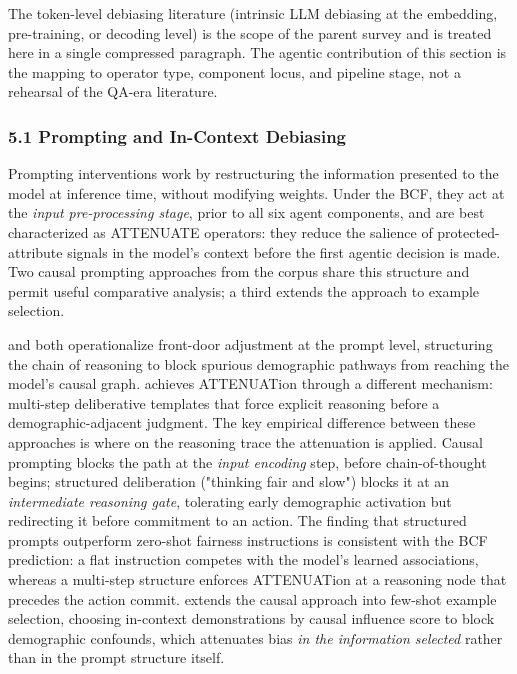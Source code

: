 \documentclass[10pt]{article}
\begin{document}
The token-level debiasing literature (intrinsic LLM debiasing at the embedding, pre-training, or decoding level) is the scope of the parent survey \cite{chu2024fairness} and is treated here in a single compressed paragraph. The agentic contribution of this section is the mapping to operator type, component locus, and pipeline stage, not a rehearsal of the QA-era literature.

\subsubsection*{5.1 Prompting and In-Context Debiasing}

Prompting interventions work by restructuring the information presented to the model at inference time, without modifying weights. Under the BCF, they act at the \emph{input pre-processing stage}, prior to all six agent components, and are best characterized as ATTENUATE operators: they reduce the salience of protected-attribute signals in the model's context before the first agentic decision is made. Two causal prompting approaches from the corpus share this structure and permit useful comparative analysis; a third extends the approach to example selection.

\cite{li2024prompting} and \cite{zhang2024causal} both operationalize front-door adjustment at the prompt level, structuring the chain of reasoning to block spurious demographic pathways from reaching the model's causal graph. \cite{furniturewala2024thinking} achieves ATTENUATion through a different mechanism: multi-step deliberative templates that force explicit reasoning before a demographic-adjacent judgment. The key empirical difference between these approaches is where on the reasoning trace the attenuation is applied. Causal prompting blocks the path at the \emph{input encoding} step, before chain-of-thought begins; structured deliberation ("thinking fair and slow") blocks it at an \emph{intermediate reasoning gate}, tolerating early demographic activation but redirecting it before commitment to an action. The \cite{furniturewala2024thinking} finding that structured prompts outperform zero-shot fairness instructions is consistent with the BCF prediction: a flat instruction competes with the model's learned associations, whereas a multi-step structure enforces ATTENUATion at a reasoning node that precedes the action commit. \cite{du2024causal} extends the causal approach into few-shot example selection, choosing in-context demonstrations by causal influence score to block demographic confounds, which attenuates bias \emph{in the information selected} rather than in the prompt structure itself.
\end{document}
